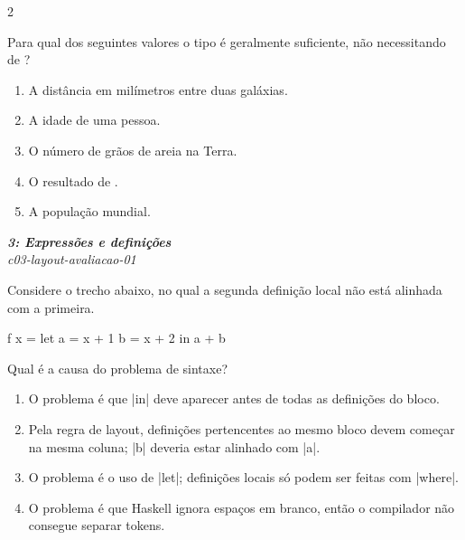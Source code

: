 \documentclass[a4paper,10pt,brazil]{article}
\begin{document}
\begin{multicols}{2}
\begin{flushright}
\end{flushright}
Para qual dos seguintes valores o tipo  é geralmente suficiente, não necessitando de ?

\begin{enumerate}
  \item A distância em milímetros entre duas galáxias.

  \item A idade de uma pessoa.

  \item O número de grãos de areia na Terra.

  \item O resultado de .

  \item A população mundial.


\end{enumerate}

\begin{flushright}
  \footnotesize
  \textit{\textbf{3: Expressões e definições}}\\
  \textit{c03-layout-avaliacao-01}\\

\end{flushright}
Considere o trecho abaixo, no qual a segunda definição local não está alinhada com a primeira.

\begin{haskellcode}
f x = let a = x + 1
        b = x + 2
      in a + b
\end{haskellcode}

Qual é a causa do problema de sintaxe?

\begin{enumerate}
  \item O problema é que \haskellinline|in| deve aparecer antes de todas as definições do bloco.

  \item Pela regra de layout, definições pertencentes ao mesmo bloco devem começar na mesma coluna; \haskellinline|b| deveria estar alinhado com \haskellinline|a|.

  \item O problema é o uso de \haskellinline|let|; definições locais só podem ser feitas com \haskellinline|where|.

  \item O problema é que Haskell ignora espaços em branco, então o compilador não consegue separar tokens.


\end{enumerate}
\end{multicols}
\end{document}
